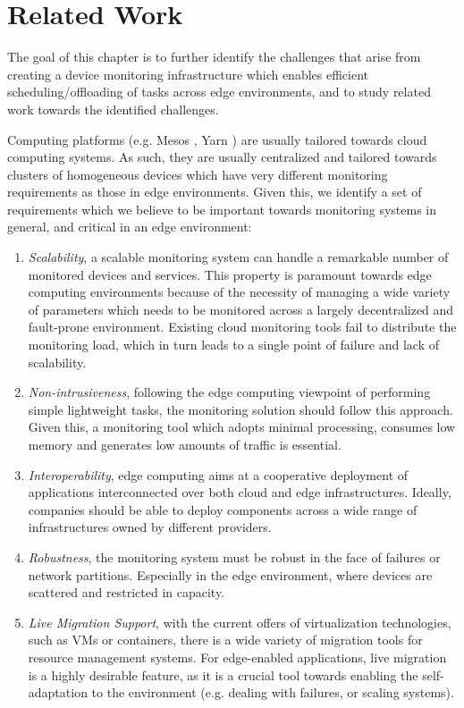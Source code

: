 \chapter{Related Work} \label{cha:related_work}

The goal of this chapter is to further identify the challenges that arise from creating a device monitoring infrastructure which enables efficient scheduling/offloading of tasks across edge environments, and to study related work towards the identified challenges.

Computing platforms (e.g. Mesos \cite{hindman2011mesos}, Yarn \cite{Vavilapalli2013ApacheHY}) are usually tailored towards cloud computing systems. As such, they are usually centralized and tailored towards clusters of homogeneous devices which have very different monitoring requirements as those in edge environments. Given this, we identify a set of requirements which we believe to be important towards monitoring systems in general, and critical in an edge environment:

\begin{enumerate}

    \item  \textit{Scalability}, a scalable monitoring system can handle a remarkable number of monitored devices and services. This property is paramount towards edge computing environments because of the necessity of managing a wide variety of parameters which needs to be monitored across a largely decentralized and fault-prone environment. Existing cloud monitoring tools fail to distribute the monitoring load, which in turn leads to a single point of failure and lack of scalability.

    \item  \textit{Non-intrusiveness}, following the edge computing viewpoint of performing simple lightweight tasks, the monitoring solution should follow this approach. Given this, a monitoring tool which adopts minimal processing, consumes low memory and generates low amounts of traffic is essential.

    \item  \textit{Interoperability}, edge computing aims at a cooperative deployment of applications interconnected over both cloud and edge infrastructures. Ideally, companies should be able to deploy components across a wide range of infrastructures owned by different providers.

    \item \textit{Robustness}, the monitoring system must be robust in the face of failures or network partitions. Especially in the edge environment, where devices are scattered and restricted in capacity. 
    
    \item \textit{Live Migration Support}, with the current offers of virtualization technologies, such as VMs or containers, there is a wide variety of migration tools for resource management systems. For edge-enabled applications, live migration is a highly desirable feature, as it is a crucial tool towards enabling the self-adaptation to the environment (e.g. dealing with failures, or scaling systems).

\end{enumerate}

